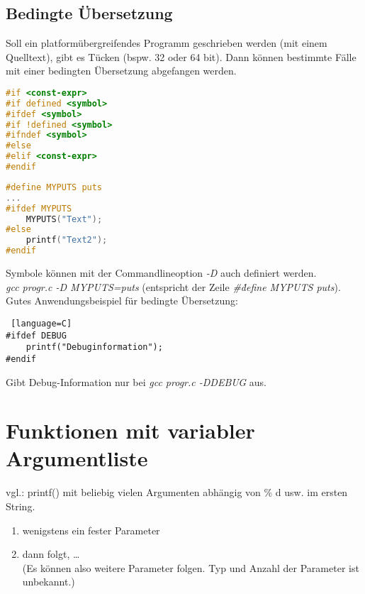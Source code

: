 \section{Bedingte Übersetzung}

Soll ein platformübergreifendes Programm geschrieben werden (mit einem Quelltext), gibt es Tücken (bspw. 32 oder 64 bit). Dann können bestimmte Fälle mit einer bedingten Übersetzung abgefangen werden.
\begin{lstlisting}[language=C]
#if <const-expr>
#if defined <symbol>
#ifdef <symbol>
#if !defined <symbol>
#ifndef <symbol>
#else 
#elif <const-expr>
#endif
\end{lstlisting}

\begin{lstlisting}[language=C]
#define MYPUTS puts
...
#ifdef MYPUTS
	MYPUTS("Text");
#else
	printf("Text2");
#endif
\end{lstlisting}
Symbole können mit der Commandlineoption \emph{-D} auch definiert werden.\\
\emph{gcc progr.c -D MYPUTS=puts} (entspricht der Zeile \emph{\#\. define MYPUTS puts}). \medskip\\
Gutes Anwendungsbeispiel für bedingte Übersetzung:
\begin{lstlisting} [language=C]
#ifdef DEBUG
	printf("Debuginformation");
#endif
\end{lstlisting}
Gibt Debug-Information nur bei \emph{gcc progr.c -DDEBUG} aus.

\chapter{Funktionen mit variabler Argumentliste}

vgl.: printf() mit beliebig vielen Argumenten abhängig von \% d usw. im ersten String.
\begin{enumerate}
\item wenigstens ein fester Parameter
\item dann folgt, … \\
(Es können also weitere Parameter folgen. Typ und Anzahl der Parameter ist unbekannt.)
\end{enumerate}

